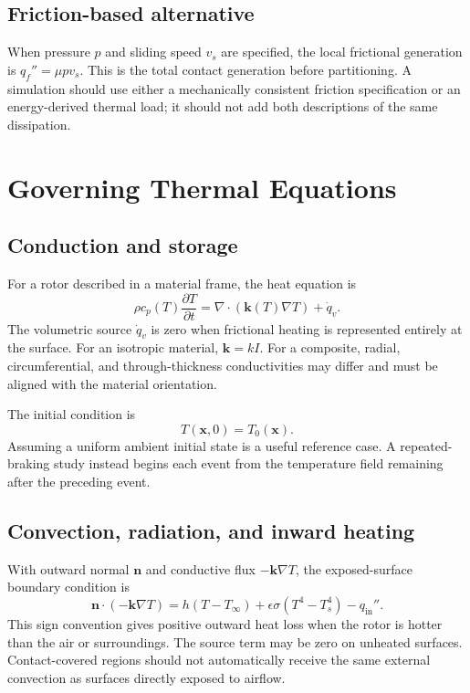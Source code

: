 \documentclass[11pt,a4paper]{article}
\newcommand{\sectionpage}[1]{\clearpage\section{#1}}
\begin{document}
\subsection{Friction-based alternative}
When pressure $p$ and sliding speed $v_s$ are specified, the local frictional generation is $q_f''=\mu p v_s$. This is the total contact generation before partitioning. A simulation should use either a mechanically consistent friction specification or an energy-derived thermal load; it should not add both descriptions of the same dissipation.

\sectionpage{Governing Thermal Equations}
\subsection{Conduction and storage}
For a rotor described in a material frame, the heat equation is
\begin{equation}\label{eq:heat}
\rho c_p(T)\frac{\partial T}{\partial t}=\nabla\cdot(\mathbf k(T)\nabla T)+\dot q_v.
\end{equation}
The volumetric source $\dot q_v$ is zero when frictional heating is represented entirely at the surface. For an isotropic material, $\mathbf k=kI$. For a composite, radial, circumferential, and through-thickness conductivities may differ and must be aligned with the material orientation.

The initial condition is
\begin{equation}
T(\mathbf x,0)=T_0(\mathbf x).
\end{equation}
Assuming a uniform ambient initial state is a useful reference case. A repeated-braking study instead begins each event from the temperature field remaining after the preceding event.

\subsection{Convection, radiation, and inward heating}
With outward normal $\mathbf n$ and conductive flux $-\mathbf k\nabla T$, the exposed-surface boundary condition is
\begin{equation}\label{eq:bc}
\mathbf n\cdot(-\mathbf k\nabla T)
=h(T-T_\infty)+\epsilon\sigma(T^4-T_s^4)-q_{\mathrm{in}}''.
\end{equation}
This sign convention gives positive outward heat loss when the rotor is hotter than the air or surroundings. The source term may be zero on unheated surfaces. Contact-covered regions should not automatically receive the same external convection as surfaces directly exposed to airflow.
\end{document}
